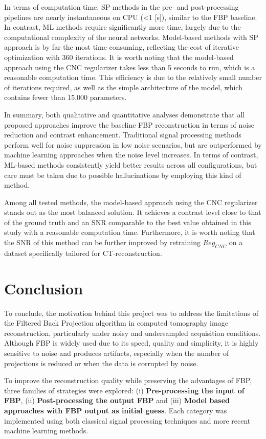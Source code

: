 \documentclass{article}
\begin{document}
In terms of computation time, SP methods in the pre- and post-processing pipelines are nearly instantaneous on CPU (<1 [s]), similar to the FBP baseline. In contrast, ML methods require significantly more time, largely due to the computational complexity of the neural networks. Model-based methods with SP approach is by far the most time consuming, reflecting the cost of iterative optimization with 360 iterations. It is worth noting that the model-based approach using the CNC regularizer takes less than 5 seconds to run, which is a reasonable computation time. This efficiency is due to the relatively small number of iterations required, as well as the simple architecture of the model, which contains fewer than 15,000 parameters. 
\bigskip

In summary, both qualitative and quantitative analyses demonstrate that all proposed approaches improve the baseline FBP reconstruction in terms of noise reduction and contrast enhancement. Traditional signal processing methods perform well for noise suppression in low noise scenarios, but are outperformed by machine learning approaches when the noise level increases. In terms of contrast, ML-based methods consistently yield better results across all configurations, but care must be taken due to possible hallucinations by employing this kind of method. 


Among all tested methods, the model-based approach using the CNC regularizer stands out as the most balanced solution. It achieves a contrast level close to that of the ground truth and an SNR comparable to the best value obtained in this study with a reasonable computation time. Furthermore, it is worth noting that the SNR of this method can be further improved by retraining $Reg_{CNC}$ on a dataset specifically tailored for CT-reconstruction.

\section{Conclusion}
To conclude, the motivation behind this project was to address the limitations of the Filtered Back Projection algorithm in computed tomography image reconstruction, particularly under noisy and undersampled acquisition conditions. Although FBP is widely used due to its speed, quality and simplicity, it is highly sensitive to noise and produces artifacts, especially when the number of projections is reduced or when the data is corrupted by noise.
\medskip

To improve the reconstruction quality while preserving the advantages of FBP, three families of strategies were explored: (i) \textbf{Pre-processing the input of FBP}, (ii) \textbf{Post-processing the output FBP} and (iii) \textbf{Model based approaches with FBP output as initial guess}.
Each category was implemented using both classical signal processing techniques and more recent machine learning methods. 
\medskip
\end{document}
